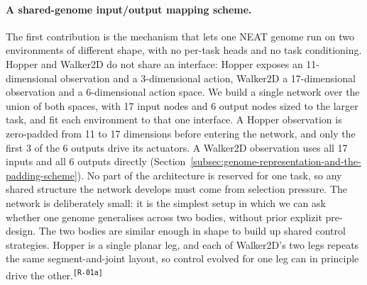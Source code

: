 \documentclass[12pt]{article}
\newcommand{\cohID}[1]{\textsuperscript{\scriptsize\texttt{[#1]}}}
\newcommand{\cohRepeat}[2]{\textcolor{cohRepeat}{#2}\cohID{#1}}
\begin{document}
\paragraph{A shared-genome input/output mapping scheme.}
The first contribution is the mechanism that lets one NEAT genome run on two environments of different shape, with no per-task heads and no task conditioning.
Hopper and Walker2D do not share an interface: Hopper exposes an 11-dimensional observation and a 3-dimensional action, Walker2D a 17-dimensional observation and a 6-dimensional action space.
We build a single network over the union of both spaces, with 17 input nodes and 6 output nodes sized to the larger task, and fit each environment to that one interface.
A Hopper observation is zero-padded from 11 to 17 dimensions before entering the network, and only the first 3 of the 6 outputs drive its actuators. A Walker2D observation uses all 17 inputs and all 6 outputs directly (Section~\ref{subsec:genome-representation-and-the-padding-scheme}).
No part of the architecture is reserved for one task, so any shared structure the network develops must come from selection pressure.
The network is deliberately small: it is the simplest setup in which we can ask whether one genome generalises across two bodies, without prior explizit pre-design.
The two bodies are similar enough in shape to build up shared control strategies.
\cohRepeat{R-01a}{Hopper is a single planar leg, and each of Walker2D's two legs repeats the same segment-and-joint layout, so control evolved for one leg can in principle drive the other.}
\end{document}

